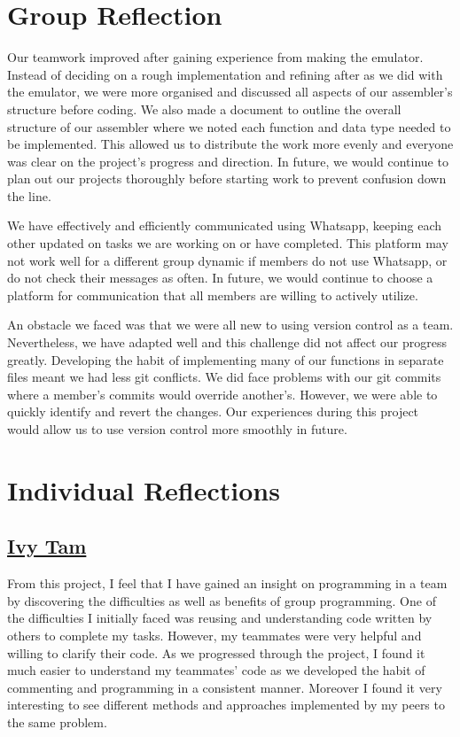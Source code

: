 \documentclass[11pt]{article}
\begin{document}
\section{Group Reflection}
Our teamwork improved after gaining experience from making the emulator. Instead of deciding on a rough implementation and refining after as we did with the emulator, we were more organised and discussed all aspects of our assembler’s structure before coding. We also made a document to outline the overall structure of our assembler where we noted each function and data type needed to be implemented. This allowed us to distribute the work more evenly and everyone was clear on the project's progress and direction. In future, we would continue to plan out our projects thoroughly before starting work to prevent confusion down the line.

We have effectively and efficiently communicated using Whatsapp, keeping each other updated on tasks we are working on or have completed. This platform may not work well for a different group dynamic if members do not use Whatsapp, or do not check their messages as often. In future, we would continue to choose a platform for communication that all members are willing to actively utilize.

 An obstacle we faced was that we were all new to using version control as a team. Nevertheless, we have adapted well and this challenge did not affect our progress greatly. Developing the habit of implementing many of our functions in separate files meant we had less git conflicts.  We did face problems with our git commits where a member’s commits would override another’s. However, we were able to quickly identify and revert the changes. Our experiences during this project would allow us to use version control more smoothly in future. 

\section{Individual Reflections}
\subsection*{\underline{Ivy Tam}}
 From this project, I feel that I have gained an insight on programming in a team by discovering the difficulties as well as benefits of group programming. One of the difficulties I initially faced was reusing and understanding code written by others to complete my tasks. However, my teammates were very helpful and willing to clarify their code. As we progressed through the project, I found it much easier to understand my teammates’ code as we developed the habit of commenting and programming in a consistent manner. Moreover I found it very interesting to see different methods and approaches implemented by my peers to the same problem.
\end{document}
